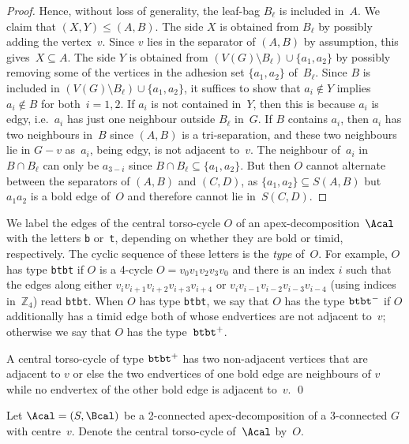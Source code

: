 \documentclass{aic}
\newcommand{\se}{\subseteq}
\theoremstyle{plain}
\theoremstyle{definition}
\theoremstyle{plain}
\theoremstyle{plain}
\newcommand{\sm}{\setminus}
\renewcommand{\le}{\leqslant}
\newcommand{\ty}[1]{{\tt#1}}
\begin{document}
\begin{proof}
Hence, without loss of generality, the leaf-bag $B_\ell$ is included in~$A$.
We claim that $(X,Y)\le (A,B)$.
The side $X$ is obtained from $B_\ell$ by possibly adding the vertex~$v$.
Since $v$ lies in the separator of $(A,B)$ by assumption, this gives~$X\subseteq A$.
The side $Y$ is obtained from $(V(G)\sm B_\ell)\cup\{a_1,a_2\}$ by possibly removing some of the vertices in the adhesion set $\{a_1,a_2\}$ of~$B_\ell$.
Since $B$ is included in $(V(G)\sm B_\ell)\cup\{a_1,a_2\}$, it suffices to show that $a_i\notin Y$ implies $a_i\notin B$ for both~$i=1,2$.
If $a_i$ is not contained in~$Y$, then this is because $a_i$ is edgy, i.e.~$a_i$ has just one neighbour outside $B_\ell$ in~$G$.
If $B$ contains $a_i$, then $a_i$ has two neighbours in~$B$ since $(A,B)$ is a tri-separation, and these two neighbours lie in $G-v$ as~$a_i$, being edgy, is not adjacent to~$v$. 
The neighbour of~$a_i$ in~$B\cap B_\ell$ can only be $a_{3-i}$ since $B\cap B_\ell\se\{a_1,a_2\}$.
But then $O$ cannot alternate between the separators of $(A,B)$ and $(C,D)$, as $\{a_1,a_2\}\se S(A,B)$ but $a_1a_2$ is a bold edge of~$O$ and therefore cannot lie in~$S(C,D)$.
\end{proof}



We label the edges of the central torso-cycle $O$ of an apex-decomposition~$\Acal$ with the letters \ty{b} or~\ty{t}, depending on whether they are bold or timid, respectively. 
The cyclic sequence of these letters is the \emph{type} of~$O$.
For example, $O$ has type \ty{btbt} if $O$ is a 4-cycle $O=v_0 v_1 v_2 v_3 v_0$ and there is an index $i$ such that the edges along either $v_i v_{i+1} v_{i+2} v_{i+3} v_{i+4}$ or $v_i v_{i-1} v_{i-2} v_{i-3} v_{i-4}$ (using indices in~$\mathbb{Z}_4$) read \ty{btbt}.
When $O$ has type \ty{btbt}, we say that $O$ has the type $\ty{btbt}^-$ if $O$ additionally has a timid edge both of whose endvertices are not adjacent to~$v$; otherwise we say that $O$ has the type~$\ty{btbt}^+$.

\begin{obs}\label{plus}
A central torso-cycle of type $\ty{btbt}^+$ has two non-adjacent vertices that are adjacent to $v$ or else the two endvertices of one bold edge are neighbours of $v$ while no endvertex of the other bold edge is adjacent to~$v$. \qed
\end{obs}

\begin{setting}\label{X}
Let $\Acal=(S,\Bcal)$ be a 2-connected apex-decom\-po\-sition of a 3-connected $G$ with centre~$v$.
Denote the central torso-cycle of~$\Acal$ by~$O$.
\end{setting}
\end{document}
